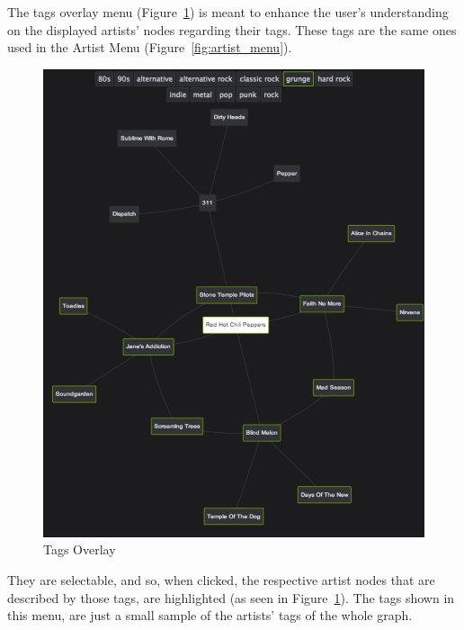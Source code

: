 \documentclass{article}
\begin{document}
      The tags overlay menu (Figure~\ref{fig:tags_overlay}) is meant to enhance the user’s understanding on the displayed artists’ nodes regarding their tags. These tags are the same ones used in the Artist Menu (Figure~\ref{fig:artist_menu}).
      \begin{figure}[th]
        \begin{center}
          \includegraphics[width=\columnwidth]{../report/figures/tags_overlay.pdf}
        \end{center}
        \caption{Tags Overlay}
        \label{fig:tags_overlay}
      \end{figure}
      They are selectable, and so, when clicked, the respective artist nodes that are described by those tags, are highlighted (as seen in Figure~\ref{fig:tags_overlay}).
      The tags shown in this menu, are just a small sample of the artists’ tags of the whole graph.


% 

\end{document}
